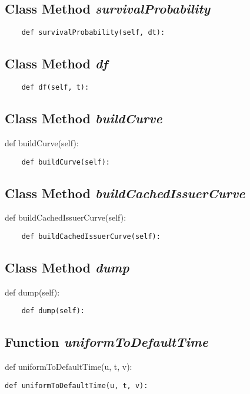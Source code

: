 \documentclass[twoside,11pt]{book}
\begin{document}
\subsection{Class Method {\it survivalProbability}}


\begin{lstlisting}
    def survivalProbability(self, dt):
\end{lstlisting}

\subsection{Class Method {\it df}}


\begin{lstlisting}
    def df(self, t):
\end{lstlisting}

\subsection{Class Method {\it buildCurve}}
def buildCurve(self):

\begin{lstlisting}
    def buildCurve(self):
\end{lstlisting}

\subsection{Class Method {\it buildCachedIssuerCurve}}
def buildCachedIssuerCurve(self):

\begin{lstlisting}
    def buildCachedIssuerCurve(self):
\end{lstlisting}

\subsection{Class Method {\it dump}}
def dump(self):

\begin{lstlisting}
    def dump(self):
\end{lstlisting}

\subsection{Function {\it uniformToDefaultTime}}
def uniformToDefaultTime(u, t, v):

\begin{lstlisting}
def uniformToDefaultTime(u, t, v):
\end{lstlisting}
\end{document}

